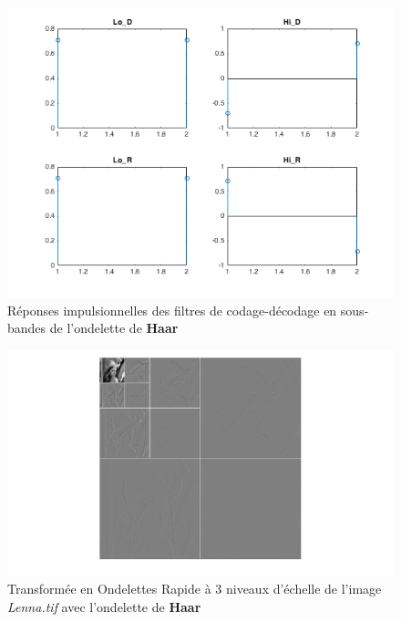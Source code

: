 \documentclass[12pt]{article}
\begin{document}
\begin{figure}[H]
	\centering
	\includegraphics[width = \textwidth]{images/3-1-reponsesImpulsionnelles-db1}
	\captionsetup{justification=centering}
	\caption{Réponses impulsionnelles des filtres de codage-décodage en sous-bandes de l'ondelette de \textbf{Haar}}
	\label{impulsedb1}
\end{figure}

\begin{figure}[H]
	\centering
	\centerline{\includegraphics[width = 1.6\textwidth]{images/3-1-db1}}
	\captionsetup{justification=centering}
	\caption{Transformée en Ondelettes Rapide à 3 niveaux d'échelle de l'image \textit{Lenna.tif} avec l'ondelette de \textbf{Haar}}
	\label{TORdb1}
\end{figure}
\end{document}
